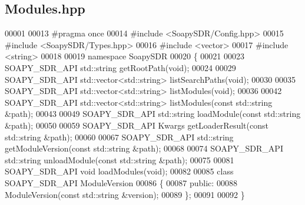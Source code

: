 \subsection{Modules.\+hpp}
\label{Modules_8hpp_source}

\begin{DoxyCode}
00001 
00013 \textcolor{preprocessor}{#pragma once}
00014 \textcolor{preprocessor}{#include <SoapySDR/Config.hpp>}
00015 \textcolor{preprocessor}{#include <SoapySDR/Types.hpp>}
00016 \textcolor{preprocessor}{#include <vector>}
00017 \textcolor{preprocessor}{#include <string>}
00018 
00019 \textcolor{keyword}{namespace }SoapySDR
00020 \{
00021 
00023 SOAPY_SDR_API std::string getRootPath(\textcolor{keywordtype}{void});
00024 
00029 SOAPY_SDR_API std::vector<std::string> listSearchPaths(\textcolor{keywordtype}{void});
00030 
00035 SOAPY_SDR_API std::vector<std::string> listModules(\textcolor{keywordtype}{void});
00036 
00042 SOAPY_SDR_API std::vector<std::string> listModules(\textcolor{keyword}{const} std::string &path);
00043 
00049 SOAPY_SDR_API std::string loadModule(\textcolor{keyword}{const} std::string &path);
00050 
00059 SOAPY_SDR_API Kwargs getLoaderResult(\textcolor{keyword}{const} std::string &path);
00060 
00067 SOAPY_SDR_API std::string getModuleVersion(\textcolor{keyword}{const} std::string &path);
00068 
00074 SOAPY_SDR_API std::string unloadModule(\textcolor{keyword}{const} std::string &path);
00075 
00081 SOAPY_SDR_API \textcolor{keywordtype}{void} loadModules(\textcolor{keywordtype}{void});
00082 
00085 \textcolor{keyword}{class }SOAPY_SDR_API ModuleVersion
00086 \{
00087 \textcolor{keyword}{public}:
00088     ModuleVersion(\textcolor{keyword}{const} std::string &version);
00089 \};
00091 
00092 \}
\end{DoxyCode}
